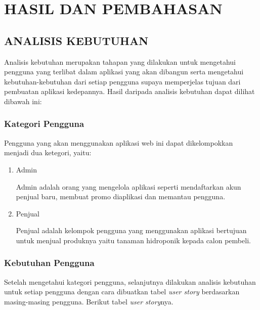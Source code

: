 \fancyhf{} 
\fancyfoot[C]{\thepage}
\chapter{HASIL DAN PEMBAHASAN}

\section{\uppercase{Analisis Kebutuhan}}
Analisis kebutuhan merupakan tahapan yang dilakukan untuk mengetahui pengguna yang terlibat dalam aplikasi yang akan dibangun serta mengetahui kebutuhan-kebutuhan dari setiap pengguna supaya memperjelas tujuan dari pembuatan aplikasi kedepannya. Hasil daripada analisis kebutuhan dapat dilihat dibawah ini:

\subsection{Kategori Pengguna}
Pengguna yang akan menggunakan aplikasi web ini dapat dikelompokkan menjadi dua ketegori, yaitu:

\begin{enumerate}
	\item Admin
		\par Admin adalah orang yang mengelola aplikasi seperti mendaftarkan akun penjual baru, membuat promo diaplikasi dan memantau pengguna.
	
	\item Penjual
		 \par Penjual adalah kelompok pengguna yang menggunakan aplikasi bertujuan untuk menjual produknya yaitu tanaman hidroponik kepada calon pembeli.
\end{enumerate}

\subsection{Kebutuhan Pengguna}
Setelah mengetahui kategori pengguna, selanjutnya dilakukan analisis kebutuhan untuk setiap pengguna dengan cara dibuatkan tabel \textit{user story} berdasarkan masing-masing pengguna. Berikut tabel \textit{user story}nya.

